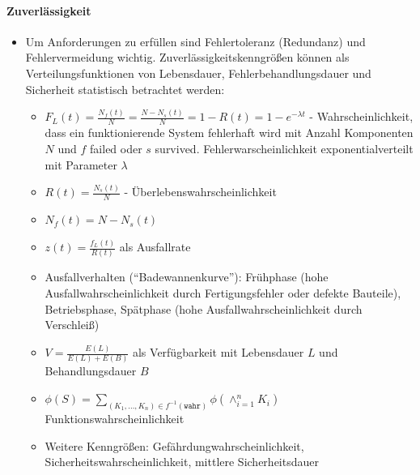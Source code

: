 	\paragraph{Zuverlässigkeit}
		\begin{itemize}
			\item Um Anforderungen zu erfüllen sind Fehlertoleranz (Redundanz) und Fehlervermeidung wichtig. Zuverlässigkeitskenngrößen können als Verteilungsfunktionen von Lebensdauer, Fehlerbehandlungsdauer und Sicherheit statistisch betrachtet werden:
			\begin{itemize}
				\item $F_L(t)=\frac{N_f(t)}{N}=\frac{N-N_s(t)}{N}=1-R(t)=1-e^{-\lambda t}$ - Wahrscheinlichkeit, dass ein funktionierende System fehlerhaft wird mit Anzahl Komponenten $N$ und $f$ failed oder $s$ survived. Fehlerwarscheinlichkeit exponentialverteilt mit Parameter $\lambda$
				\item $R(t)=\frac{N_s(t)}{N}$ - Überlebenswahrscheinlichkeit
				\item $N_f(t)=N-N_s(t)$
				\item $z(t)=\frac{f_L(t)}{R(t)}$ als Ausfallrate
				\item Ausfallverhalten ("`Badewannenkurve"'): Frühphase (hohe Ausfallwahrscheinlichkeit durch Fertigungsfehler oder defekte Bauteile), Betriebsphase, Spätphase (hohe Ausfallwahrscheinlichkeit durch Verschleiß)
				\item $V=\frac{E(L)}{E(L)+E(B)}$ als Verfügbarkeit mit Lebensdauer $L$ und Behandlungsdauer $B$
				\item $\phi(S)=\sum_{(K_1,\dots,K_n)\in f^{-1}(\texttt{wahr})}\phi(\wedge_{i=1}^n K_i) $ Funktionswahrscheinlichkeit
				\item Weitere Kenngrößen: Gefährdungwahrscheinlichkeit, Sicherheitswahrscheinlichkeit, mittlere Sicherheitsdauer
			\end{itemize}
		\end{itemize}

